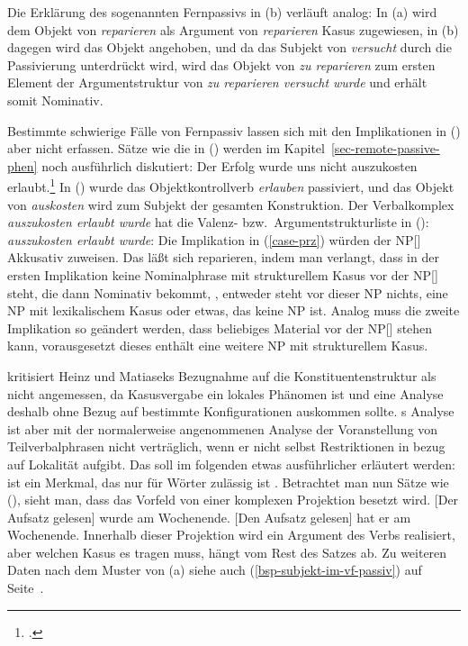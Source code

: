 Die Erklärung des sogenannten Fernpassivs in (b) verläuft analog:
In (a) wird dem Objekt von \emph{reparieren} als Argument von \emph{reparieren} Kasus
zugewiesen, in (b) dagegen wird das Objekt angehoben, und da
das Subjekt von \emph{versucht} durch die Passivierung unterdrückt wird,
wird das Objekt von \emph{zu reparieren} zum ersten Element der
Argumentstruktur von \emph{zu reparieren versucht wurde} und erhält somit
Nominativ.

Bestimmte schwierige Fälle von Fernpassiv lassen sich mit den Implikationen
in () aber nicht erfassen. Sätze wie die
in () werden im Kapitel~\ref{sec-remote-passive-phen}
noch ausführlich diskutiert:
\ea\label{erfolg-auszukosten-erlaubt-kasus}
Der Erfolg        wurde uns      nicht auszukosten erlaubt.\footnote{
        .%
}
\z
In () wurde das Objektkontrollverb \emph{erlauben} passiviert,
und das Objekt von \emph{auskosten} wird zum Subjekt der gesamten Konstruktion.
Der Verbalkomplex \emph{auszukosten erlaubt wurde} hat die Valenz- bzw.\
Argumentstrukturliste in ():
\ea
\emph{auszukosten erlaubt wurde}:   \subcat {}
\z
Die Implikation in (\ref{case-prz}) würden der NP[\str] Akkusativ zuweisen.
Das läßt sich reparieren, indem man verlangt, dass in der ersten Implikation
keine Nominalphrase mit strukturellem Kasus vor der NP[\str] steht, die dann
Nominativ bekommt, \dash, entweder steht vor dieser NP nichts, eine NP mit lexikalischem
Kasus oder etwas, das keine NP ist. Analog muss die zweite Implikation 
so geändert werden, dass beliebiges Material vor der NP[\str] stehen kann,
vorausgesetzt dieses enthält eine weitere NP mit strukturellem Kasus.

\prz kritisiert Heinz und Matiaseks Bezugnahme auf die Konstituentenstruktur
als nicht angemessen, da Kasusvergabe ein lokales Phänomen ist und eine
Analyse deshalb ohne Bezug auf bestimmte Konfigurationen auskommen sollte. \prz{}s Analyse ist aber
mit der normalerweise angenommenen Analyse der Voranstellung von Teilverbalphrasen nicht verträglich, wenn er nicht
selbst Restriktionen in bezug auf Lokalität\is{Lokalität} aufgibt. Das soll im folgenden
etwas ausführlicher erläutert werden: \argst ist ein Merkmal, das nur für
Wörter zulässig ist \citep[\page 236]{Prze99}. Betrachtet man nun Sätze wie
(\mex{1}), sieht man, dass das Vorfeld von einer komplexen Projektion
besetzt wird.
\eal
\label{bsp-der-aufsatz-gelesen}
\ex {}[Der Aufsatz gelesen] wurde am Wochenende.
\ex {}[Den Aufsatz gelesen] hat er am Wochenende.
\zl
Innerhalb dieser Projektion wird ein Argument des Verbs realisiert,
aber welchen Kasus es tragen muss, hängt vom Rest des Satzes ab.
Zu weiteren Daten nach dem Muster von (\mex{0}a)
siehe auch (\ref{bsp-subjekt-im-vf-passiv}) auf Seite~\pageref{bsp-subjekt-im-vf-passiv}.


